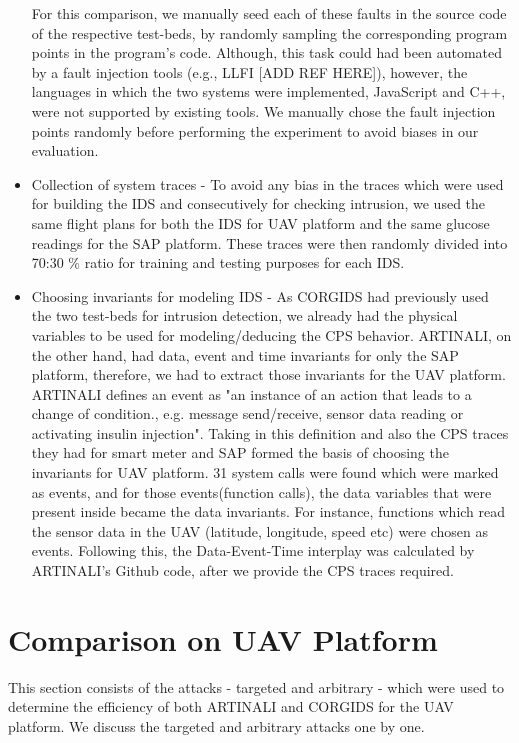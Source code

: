 \begin{itemize}
For this comparison, we manually seed each of these faults in the source code of the respective test-beds, by randomly sampling the corresponding program points in the program’s code. Although, this task could had been automated by a fault injection tools (e.g., LLFI [ADD REF HERE]), however, the languages in which the two systems were implemented, JavaScript and C++, were not supported by existing tools. We manually chose the fault injection points randomly before performing the experiment to avoid biases in our evaluation.

\item Collection of system traces - To avoid any bias in the traces which were used for building the IDS and consecutively for checking intrusion, we used the same flight plans for both the IDS for UAV platform and the same glucose readings for the SAP platform. These traces were then randomly divided into 70:30 \% ratio for training and testing purposes for each IDS.

\item Choosing invariants for modeling IDS - As CORGIDS had previously used the two test-beds for intrusion detection, we already had the physical variables to be used for modeling/deducing the CPS behavior. ARTINALI, on the other hand, had data, event and time invariants for only the SAP platform, therefore, we had to extract those invariants for the UAV platform. ARTINALI defines an event as "an instance of an action that leads to a change of condition., e.g. message send/receive, sensor data reading or activating insulin injection". Taking in this definition and also the CPS traces they had for smart meter and SAP formed the basis of choosing the invariants for UAV platform. 31 system calls were found which were marked as events, and for those events(function calls), the data variables that were present inside became the data invariants. For instance, functions which read the sensor data in the UAV (latitude, longitude, speed etc) were chosen as events. Following this, the Data-Event-Time interplay was calculated by ARTINALI's Github code, after we provide the CPS traces required.
\end{itemize}

\section{Comparison on UAV Platform}
This section consists of the attacks - targeted and arbitrary - which were used to determine the efficiency of both ARTINALI and CORGIDS for the UAV platform. We discuss the targeted and arbitrary attacks one by one.


